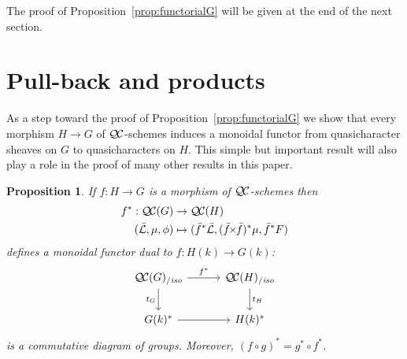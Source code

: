 \documentclass[11pt]{amsart}
\theoremstyle{plain}
\newtheorem{proposition}[theorem]{Proposition}
\theoremstyle{definition}
\theoremstyle{remark}
\newcommand{\Fq}{k}
\newcommand{\gqcs}[1]{{\mathcal{\bar #1}}}
\newcommand{\QC}{{\mathcal{Q\hskip-0.8pt C}}}
\newcommand{\QCiso}[1]{\QC(#1)_{/\textit{iso}}}
\newcommand{\trFrob}[1]{t_{#1}}
\renewcommand{\bf}{\bar{f}}
\newcommand{\tight}[3]{\hspace{-#1pt}{#2}\hspace{-#3pt}}
\newcommand{\bfxf}{\text{$\bar{f} \tight{1}{\times}{1} \bar{f}$}}
\begin{document}
The proof of Proposition~\ref{prop:functorialG} will be given at the end of the next section.

\section{Pull-back and products}\label{sec:pullback}

As a step toward the proof of Proposition~\ref{prop:functorialG} we show that every
morphism  $H \to G$ of $\QC$-schemes induces a monoidal functor from quasicharacter
sheaves on $G$ to quasicharacters on $H$. This simple but important result will also
play a role in the proof of many other results in this paper.

\begin{proposition}\label{prop:pullback}
  If $f : H\to G$ is a morphism of $\QC$-schemes then
  \begin{align*}
  f^* : \QC(G) &\to \QC(H) \\
  (\gqcs{L},\mu,\phi) &\mapsto (\bf^*\gqcs{L},(\bfxf)^*\mu,\bf^*F)
  \end{align*}
  defines a monoidal functor dual to $f \colon H(\Fq) \to G(\Fq)$:
  \[
  \begin{tikzcd}[row sep=20, column sep=30]
   \QCiso{G} \rar{f^*} \arrow[swap]{d}{\trFrob{G}} & \QCiso{H} \dar{\trFrob{H}} \\
   G(\Fq)^* \rar & H(\Fq)^*
  \end{tikzcd}
  \]
  is a commutative diagram of groups.  Moreover, $(f\circ g)^* = g^* \circ f^*$.
\end{proposition}
\end{document}
